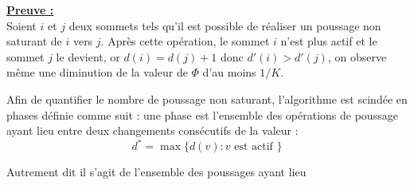 \underline{\textbf{Preuve :}}\\
Soient $i$ et $j$ deux sommets tels qu'il est possible de réaliser un poussage non saturant de $i$
vers $j$.  Après cette opération, le sommet $i$ n'est plus actif et le sommet $j$ le devient, or
$d(i) = d(j) + 1$ donc $d'(i) > d'(j)$, on observe même une diminution de la valeur de $\Phi$ d'au
moins $1/K$.

Afin de quantifier le nombre de poussage non saturant, l'algorithme est scindée en phases définie
comme suit : une phase est l'ensemble des opérations de poussage ayant lieu entre deux changements
consécutifs de la valeur :
\begin{equation}
	d^* = \max\{d(v) : v \mbox{ est actif }\}
\end{equation}

Autrement dit il s'agit de l'ensemble des poussages ayant lieu
